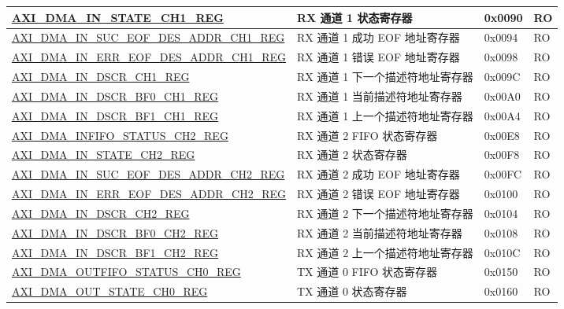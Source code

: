 \begin{longtable}{ | l | l | p{1.3cm} | l | }
\hyperref[regdesc:AXIDMAINSTATECHNREG]{AXI\_DMA\_IN\_STATE\_CH1\_REG} & RX 通道 1 状态寄存器 & 0x0090 & RO \\ \hline
\hyperref[regdesc:AXIDMAINSUCEOFDESADDRCHNREG]{AXI\_DMA\_IN\_SUC\_EOF\_DES\_ADDR\_CH1\_REG} & RX 通道 1 成功 EOF 地址寄存器 & 0x0094 & RO \\ \hline
\hyperref[regdesc:AXIDMAINERREOFDESADDRCHNREG]{AXI\_DMA\_IN\_ERR\_EOF\_DES\_ADDR\_CH1\_REG} & RX 通道 1 错误 EOF 地址寄存器 & 0x0098 & RO \\ \hline
\hyperref[regdesc:AXIDMAINDSCRCHNREG]{AXI\_DMA\_IN\_DSCR\_CH1\_REG} & RX 通道 1 下一个描述符地址寄存器 & 0x009C & RO \\ \hline
\hyperref[regdesc:AXIDMAINDSCRBF0CHNREG]{AXI\_DMA\_IN\_DSCR\_BF0\_CH1\_REG} & RX 通道 1 当前描述符地址寄存器 & 0x00A0 & RO \\ \hline
\hyperref[regdesc:AXIDMAINDSCRBF1CHNREG]{AXI\_DMA\_IN\_DSCR\_BF1\_CH1\_REG} & RX 通道 1 上一个描述符地址寄存器 & 0x00A4 & RO \\ \hline
\hyperref[regdesc:AXIDMAINFIFOSTATUSCHNREG]{AXI\_DMA\_INFIFO\_STATUS\_CH2\_REG} & RX 通道 2 FIFO 状态寄存器 & 0x00E8 & RO \\ \hline
\hyperref[regdesc:AXIDMAINSTATECHNREG]{AXI\_DMA\_IN\_STATE\_CH2\_REG} & RX 通道 2 状态寄存器 & 0x00F8 & RO \\ \hline
\hyperref[regdesc:AXIDMAINSUCEOFDESADDRCHNREG]{AXI\_DMA\_IN\_SUC\_EOF\_DES\_ADDR\_CH2\_REG} & RX 通道 2 成功 EOF 地址寄存器 & 0x00FC & RO \\ \hline
\hyperref[regdesc:AXIDMAINERREOFDESADDRCHNREG]{AXI\_DMA\_IN\_ERR\_EOF\_DES\_ADDR\_CH2\_REG} & RX 通道 2 错误 EOF 地址寄存器 & 0x0100 & RO \\ \hline
\hyperref[regdesc:AXIDMAINDSCRCHNREG]{AXI\_DMA\_IN\_DSCR\_CH2\_REG} & RX 通道 2 下一个描述符地址寄存器 & 0x0104 & RO \\ \hline
\hyperref[regdesc:AXIDMAINDSCRBF0CHNREG]{AXI\_DMA\_IN\_DSCR\_BF0\_CH2\_REG} & RX 通道 2 当前描述符地址寄存器 & 0x0108 & RO \\ \hline
\hyperref[regdesc:AXIDMAINDSCRBF1CHNREG]{AXI\_DMA\_IN\_DSCR\_BF1\_CH2\_REG} & RX 通道 2 上一个描述符地址寄存器 & 0x010C & RO \\ \hline
\hyperref[regdesc:AXIDMAOUTFIFOSTATUSCHNREG]{AXI\_DMA\_OUTFIFO\_STATUS\_CH0\_REG} & TX 通道 0 FIFO 状态寄存器 & 0x0150 & RO \\ \hline
\hyperref[regdesc:AXIDMAOUTSTATECHNREG]{AXI\_DMA\_OUT\_STATE\_CH0\_REG} & TX 通道 0 状态寄存器 & 0x0160 & RO \\ \hline

\end{longtable}

